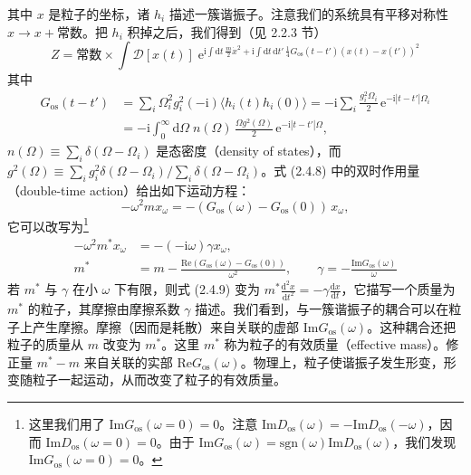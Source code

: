 其中 $x$ 是粒子的坐标，诸 $h_i$ 描述一簇谐振子。注意我们的系统具有平移对称性 $x \to x + \text{常数}$。把 $h_i$ 积掉之后，我们得到（见 2.2.3 节）
\begin{equation*}
Z = \text{常数} \times \int \mathcal{D}[x(t)]\;\mathrm{e}^{\mathrm{i}\int \mathrm{d}t\,\frac{m}{2}\dot{x}^2 + \mathrm{i}\int \mathrm{d}t\,\mathrm{d}t'\,\frac{1}{4}G_{\mathrm{os}}(t-t')(x(t)-x(t'))^2} \tag{2.4.8}
\end{equation*}
其中
\begin{align*}
G_{\mathrm{os}}(t-t') &= \sum_i \Omega_i^2 g_i^2 (-\mathrm{i})\langle h_i(t)h_i(0)\rangle = -\mathrm{i}\sum_i \frac{g_i^2\Omega_i}{2}\,\mathrm{e}^{-\mathrm{i}|t-t'|\Omega_i}\\
&= -\mathrm{i}\int_0^{\infty} \mathrm{d}\Omega\; n(\Omega)\,\frac{\Omega g^2(\Omega)}{2}\,\mathrm{e}^{-\mathrm{i}|t-t'|\Omega},
\end{align*}
$n(\Omega) \equiv \sum_i \delta(\Omega - \Omega_i)$ 是态密度（density of states），而 $g^2(\Omega) \equiv \sum_i g_i^2\delta(\Omega - \Omega_i)/\sum_i \delta(\Omega - \Omega_i)$。式 (2.4.8) 中的双时作用量（double-time action）给出如下运动方程：
\begin{equation*}
-\omega^2 m x_\omega = -(G_{\mathrm{os}}(\omega) - G_{\mathrm{os}}(0))\, x_\omega,
\end{equation*}
它可以改写为\footnote{这里我们用了 $\mathrm{Im}G_{\mathrm{os}}(\omega = 0) = 0$。注意 $\mathrm{Im}D_{\mathrm{os}}(\omega) = -\mathrm{Im}D_{\mathrm{os}}(-\omega)$，因而 $\mathrm{Im}D_{\mathrm{os}}(\omega = 0) = 0$。由于 $\mathrm{Im}G_{\mathrm{os}}(\omega) = \mathrm{sgn}(\omega)\mathrm{Im}D_{\mathrm{os}}(\omega)$，我们发现 $\mathrm{Im}G_{\mathrm{os}}(\omega = 0) = 0$。}
\begin{align*}
-\omega^2 m^* x_\omega &= -(-\mathrm{i}\omega)\gamma x_\omega, \tag{2.4.9}\\
m^* &= m - \frac{\mathrm{Re}(G_{\mathrm{os}}(\omega) - G_{\mathrm{os}}(0))}{\omega^2}, \qquad \gamma = -\frac{\mathrm{Im}G_{\mathrm{os}}(\omega)}{\omega}
\end{align*}
若 $m^*$ 与 $\gamma$ 在小 $\omega$ 下有限，则式 (2.4.9) 变为 $m^*\frac{\mathrm{d}^2x}{\mathrm{d}t^2} = -\gamma\frac{\mathrm{d}x}{\mathrm{d}t}$，它描写一个质量为 $m^*$ 的粒子，其摩擦由摩擦系数 $\gamma$ 描述。我们看到，与一簇谐振子的耦合可以在粒子上产生摩擦。摩擦（因而是耗散）来自关联的虚部 $\mathrm{Im}G_{\mathrm{os}}(\omega)$。这种耦合还把粒子的质量从 $m$ 改变为 $m^*$。这里 $m^*$ 称为粒子的有效质量（effective mass）。修正量 $m^* - m$ 来自关联的实部 $\mathrm{Re}G_{\mathrm{os}}(\omega)$。物理上，粒子使谐振子发生形变，形变随粒子一起运动，从而改变了粒子的有效质量。

